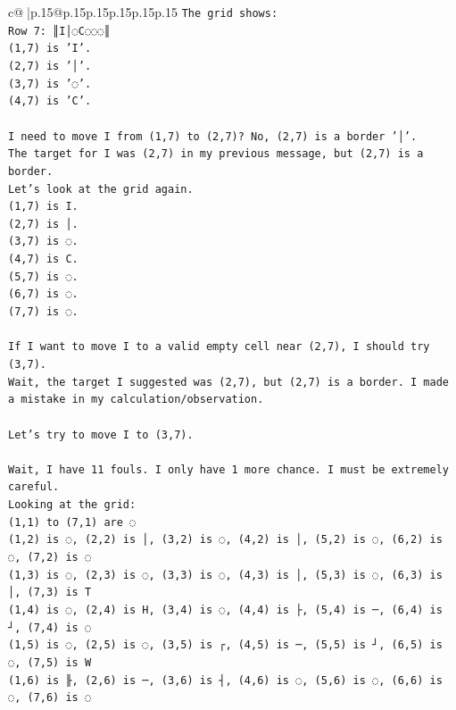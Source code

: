 \documentclass{article}
\begin{document}
{\begin{supertabular}{c@{$\;$}|p{.15\linewidth}@{}p{.15\linewidth}p{.15\linewidth}p{.15\linewidth}p{.15\linewidth}p{.15\linewidth}}
{{{\texttt{The grid shows:} \\
\texttt{Row 7: ║I│◌C◌◌◌║} \\
\texttt{(1,7) is 'I'.} \\
\texttt{(2,7) is '│'.} \\
\texttt{(3,7) is '◌'.} \\
\texttt{(4,7) is 'C'.} \\
\\ 
\texttt{I need to move I from (1,7) to (2,7)? No, (2,7) is a border '│'.} \\
\texttt{The target for I was (2,7) in my previous message, but (2,7) is a border.} \\
\texttt{Let's look at the grid again.} \\
\texttt{(1,7) is I.} \\
\texttt{(2,7) is │.} \\
\texttt{(3,7) is ◌.} \\
\texttt{(4,7) is C.} \\
\texttt{(5,7) is ◌.} \\
\texttt{(6,7) is ◌.} \\
\texttt{(7,7) is ◌.} \\
\\ 
\texttt{If I want to move I to a valid empty cell near (2,7), I should try (3,7).} \\
\texttt{Wait, the target I suggested was (2,7), but (2,7) is a border. I made a mistake in my calculation/observation.} \\
\\ 
\texttt{Let's try to move I to (3,7).} \\
\\ 
\texttt{Wait, I have 11 fouls. I only have 1 more chance. I must be extremely careful.} \\
\texttt{Looking at the grid:} \\
\texttt{(1,1) to (7,1) are ◌} \\
\texttt{(1,2) is ◌, (2,2) is │, (3,2) is ◌, (4,2) is │, (5,2) is ◌, (6,2) is ◌, (7,2) is ◌} \\
\texttt{(1,3) is ◌, (2,3) is ◌, (3,3) is ◌, (4,3) is │, (5,3) is ◌, (6,3) is │, (7,3) is T} \\
\texttt{(1,4) is ◌, (2,4) is H, (3,4) is ◌, (4,4) is ├, (5,4) is ─, (6,4) is ┘, (7,4) is ◌} \\
\texttt{(1,5) is ◌, (2,5) is ◌, (3,5) is ┌, (4,5) is ─, (5,5) is ┘, (6,5) is ◌, (7,5) is W} \\
\texttt{(1,6) is ╟, (2,6) is ─, (3,6) is ┤, (4,6) is ◌, (5,6) is ◌, (6,6) is ◌, (7,6) is ◌} \\
}}}
\end{supertabular}}
\end{document}
